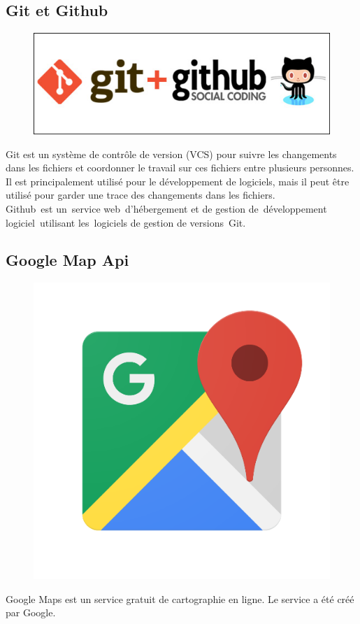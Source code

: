 \documentclass[12pt,a4paper]{report}
\begin{document}
		\subsection{Git et Github}
		\begin{figure}
		\includegraphics[scale=0.25]{./graphics/gitgithub.jpg}
		\end{figure}
		Git est un système de contrôle de version (VCS) pour suivre les changements dans les fichiers et coordonner le travail sur ces fichiers entre plusieurs personnes. Il est principalement utilisé pour le développement de logiciels, mais il peut être utilisé pour garder une trace des changements dans les fichiers.\\
Github est un service web d'hébergement et de gestion de développement logiciel utilisant les logiciels de gestion de versions Git.\\

		
		\subsection{Google Map Api}
		\begin{figure}
		\includegraphics[scale=0.15]{./graphics/google.png}
		\end{figure}
		Google Maps est un service gratuit de cartographie en ligne. Le service a été créé par Google.\\
\end{document}
